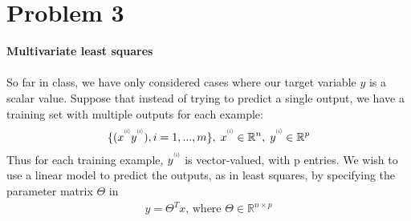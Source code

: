 \documentclass{article}
\newcommand{\supi}[1]{\scalebox{0.6}[0.75]{$^{(#1)}$}}
\begin{document}
\section{Problem 3}
\textbf{Multivariate least squares\\\\}
So far in class, we have only considered cases where our target variable $y$ is a scalar value. Suppose that instead of trying to predict a single output, we have a training set with multiple outputs for each example:\\
\begin{align*}
    \{(x^{\supi{i}}y^{\supi{i}}),i=1,...,m\},\; x^{\supi{i}}\in\mathbb{R}^n,\; y^{\supi{i}}\in\mathbb{R}^p
\end{align*}
Thus for each training example, $y^{\supi{i}}$ is vector-valued, with p entries. We wish to use a linear model to predict the outputs, as in least squares, by specifying the parameter matrix $\Theta$ in
\begin{align*}
    y = \Theta^Tx \text{, where }\Theta \in \mathbb{R}^{n\times p}
\end{align*}
\end{document}
